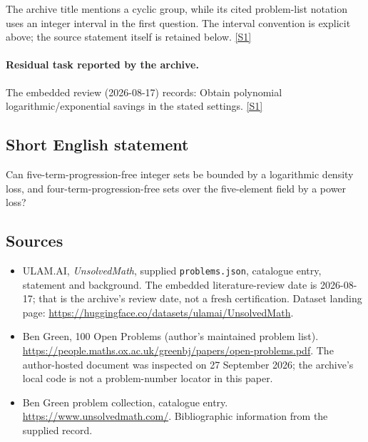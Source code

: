 \documentclass[11pt,a4paper]{article}
\newcommand{\sref}[2]{\hyperlink{source:#1:#2}{[S#2]}}
\begin{document}
The archive title mentions a cyclic group, while its cited problem-list notation uses an integer interval in the first question. The interval convention is explicit above; the source statement itself is retained below. \sref{statement}{1}

\paragraph{Residual task reported by the archive.}

The embedded review (2026-08-17) records: Obtain polynomial logarithmic/exponential savings in the stated settings. \sref{statement}{1}

\subsection{Short English statement}

Can five-term-progression-free integer sets be bounded by a logarithmic density loss, and four-term-progression-free sets over the five-element field by a power loss?

\subsection{Sources}

{\small

\begin{itemize}

\item[\hypertarget{source:statement:1}{S1}] ULAM.AI, \emph{UnsolvedMath}, supplied \texttt{problems.json}, catalogue entry, statement and background. The embedded literature-review date is 2026-08-17; that is the archive’s review date, not a fresh certification. Dataset landing page: \url{https://huggingface.co/datasets/ulamai/UnsolvedMath}.

\item[\hypertarget{source:statement:2}{S2}] Ben Green, 100 Open Problems (author’s maintained problem list). \url{https://people.maths.ox.ac.uk/greenbj/papers/open-problems.pdf}. The author-hosted document was inspected on 27 September 2026; the archive’s local code is not a problem-number locator in this paper.

\item[\hypertarget{source:statement:3}{S3}] Ben Green problem collection, catalogue entry. \url{https://www.unsolvedmath.com/}. Bibliographic information from the supplied record.

\end{itemize}

}

\label{end:statement}
\end{document}
